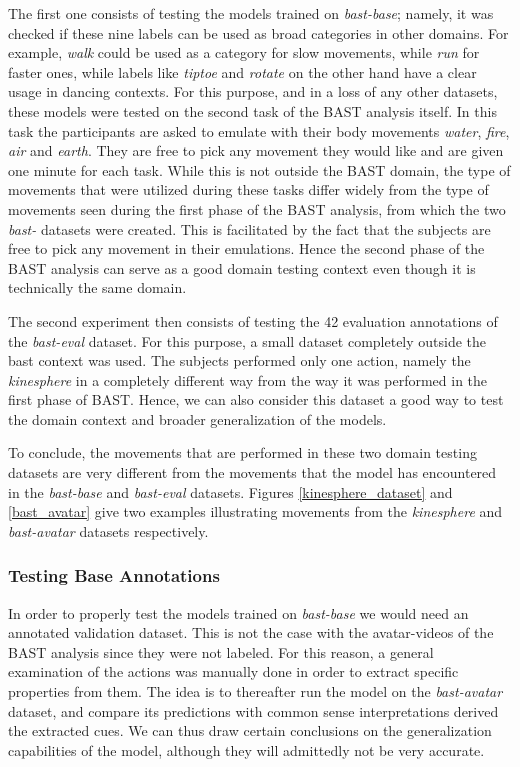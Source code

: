 \documentclass[extern,palatino]{cgMA}
\begin{document}
The first one consists of testing the models trained on \textit{bast-base}; namely, it was checked if these nine labels can be used as broad categories in other domains. For example, \textit{walk} could be used as a category for slow movements, while \textit{run} for faster ones, while labels like \textit{tiptoe} and \textit{rotate} on the other hand have a clear usage in dancing contexts. For this purpose, and in a loss of any other datasets, these models were tested on the second task of the BAST analysis itself. In this task the participants are asked to emulate with their body movements \textit{water}, \textit{fire}, \textit{air} and \textit{earth}. They are free to pick any movement they would like and are given one minute for each task. While this is not outside the BAST domain, the type of movements that were utilized during these tasks differ widely from the type of movements seen during the first phase of the BAST analysis, from which the two \textit{bast-} datasets were created. This is facilitated by the fact that the subjects are free to pick any movement in their emulations. Hence the second phase of the BAST analysis can serve as a good domain testing context even though it is technically the same domain.

The second experiment then consists of testing the 42 evaluation annotations of the \textit{bast-eval} dataset. For this purpose, a small dataset completely outside the bast context was used. The subjects performed only one action, namely the \textit{kinesphere} in a completely different way from the way it was performed in the first phase of BAST. Hence, we can also consider this dataset a good way to test the domain context and broader generalization of the models.

To conclude, the movements that are performed in these two domain testing datasets are very different from the movements that the model has encountered in the \textit{bast-base} and \textit{bast-eval} datasets. Figures \ref{kinesphere_dataset} and \ref{bast_avatar} give two examples illustrating movements from the \textit{kinesphere} and \textit{bast-avatar} datasets respectively.

\subsubsection{Testing Base Annotations} 
\label{research_question_3_1}

In order to properly test the models trained on \textit{bast-base} we would need an annotated validation dataset. This is not the case with the avatar-videos of the BAST analysis since they were not labeled. For this reason, a general examination of the actions was manually done in order to extract specific properties from them. The idea is to thereafter run the model  on the \textit{bast-avatar} dataset, and compare its predictions with common sense interpretations derived the extracted cues. We can thus draw certain conclusions on the generalization capabilities of the model, although they will admittedly not be very accurate.
\end{document}
